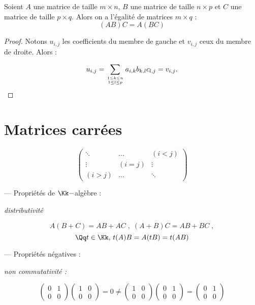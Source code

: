 \documentclass[class=report,crop=false]{standalone}
\begin{document}
\begin{proposition}[Associativité]
Soient $A$ une matrice de taille $m \times n$, $B$ une matrice de taille $n \times p$ et $C$ une matrice de taille $p \times q$. Alors on a l'égalité de matrices $m \times q$ :
\[(AB)C = A(BC)\]
\end{proposition}

\begin{proof}
Notons $u_{i,j}$  les coefficients du membre de gauche et $v_{i,j}$ ceux du membre de droite. Alors :

\[u_{i,j} = \sum_{1 \le k \le n \atop 1 \le l \le p} a_{i,k}b_{k,l}c_{l,j} = v_{i,j} .\]
\end{proof}

\section{Matrices carrées}


\[\left(\begin{array}{ccc}
\ddots & ... & (i < j)\\
\vdots & (i=j) & \vdots\\
(i>j) & ... & \ddots
\end{array}\right)\]


--- Propriétés de $\Kk-$algèbre :

{\it distributivité}

\[A(B+C) = AB + AC \; ,\; (A+B)C = AB + BC \;, \] \[ \Qq t \in \Kk,\, t(A)B=A(tB) = t(AB) \]

--- Propriétés \og négatives \fg :

{\it non commutativité :} 


\[\left(\begin{array}{cc}
0&1 \\
0&0
\end{array}\right) \left(\begin{array}{cc}
1&0 \\
0 & 0
\end{array}\right) = 0 \neq  \left(\begin{array}{cc}
1&0 \\
0 & 0
\end{array}\right)\left(\begin{array}{cc}
0&1 \\
0&0
\end{array}\right) = \left(\begin{array}{cc}
0&1 \\
0&0
\end{array}\right)\] 
\end{document}
